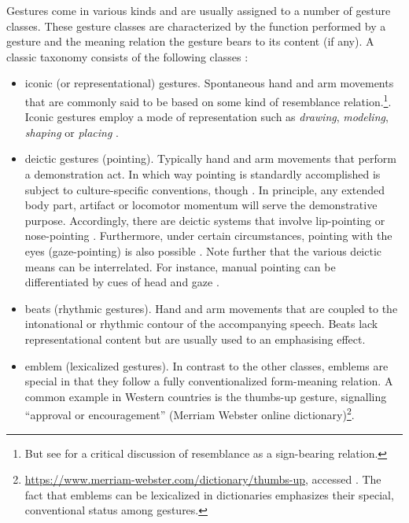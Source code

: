 \documentclass[output=paper]{langsci/langscibook}
\begin{document}
Gestures come in various kinds and are usually assigned to a number of gesture classes.
%
These gesture classes are characterized by the function performed by a gesture and the meaning relation the gesture bears to its content (if any).
%
A classic taxonomy consists of the following classes \citep{McNeill:1992}:
%
\begin{itemize}
\item iconic (or representational)   gestures. Spontaneous hand and arm movements that are commonly said to be based on some kind of resemblance relation.\footnote{But see \citet{Luecking:2013:a} for a critical discussion of resemblance as a sign-bearing relation.}. Iconic gestures employ a mode of representation such as \textit{drawing}, \textit{modeling}, \textit{shaping} or \textit{placing} \citep{Streeck:2008,Mueller:1998}.
\item deictic gestures (pointing). Typically hand and arm movements that perform a demonstration act. 
%
In which way pointing is standardly accomplished is subject to culture-specific conventions, though \citep{Wilkins:2003}. 
%
In principle, any extended body part, artifact or locomotor momentum will serve the demonstrative purpose. 
%
Accordingly, there are deictic systems that involve lip-pointing \citep{Enfield:2001} or nose-pointing \citep{Cooperrider:Nunez:2012}. 
%
Furthermore, under certain circumstances, pointing with the eyes (gaze-pointing) is also possible \citep{Hadjikhani:Hoge:Snyder:de:Gelder:2008}. 
%
Note further that the various deictic means can be interrelated. For instance, manual pointing can be differentiated by cues of head and gaze \citep{Butterworth:Itakura:2000}.
\item beats  (rhythmic gestures). Hand and arm movements that are coupled to the intonational or rhythmic contour of the accompanying speech. Beats lack representational content but are usually used to an emphasising effect.
\item emblem  (lexicalized gestures). In contrast to the other classes, emblems are special in that they follow a fully conventionalized form-meaning relation. A common example in Western countries is the thumbs-up gesture, signalling \enquote{approval or encouragement} (Merriam Webster online dictionary)\footnote{\url{https://www.merriam-webster.com/dictionary/thumbs-up}, accessed . The fact that emblems can be lexicalized in dictionaries emphasizes their special, conventional status among gestures.}.
\end{itemize}
\end{document}
